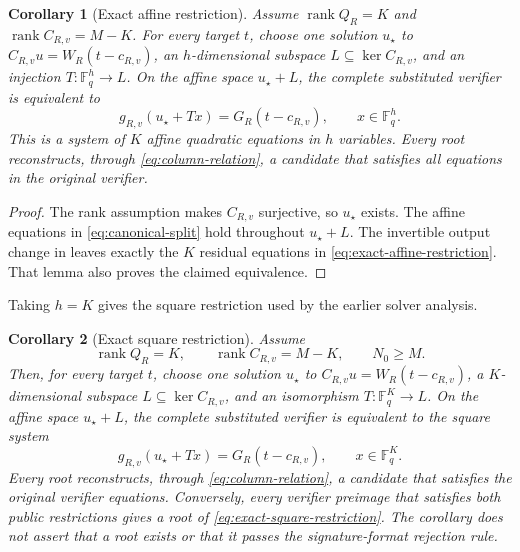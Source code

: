 \documentclass[11pt]{article}
\newtheorem{corollary}[corollary]{Corollary}
\newcommand{\F}{\mathbb F}
\newcommand{\rank}{\operatorname{rank}}
\begin{document}
\begin{corollary}[Exact affine restriction]
\label{cor:exact-affine-restriction}
Assume $\rank Q_R=K$ and $\rank C_{R,v}=M-K$.  For every target $t$, choose
one solution $u_\star$ to $C_{R,v}u=W_R(t-c_{R,v})$, an $h$-dimensional
subspace $L\subseteq\ker C_{R,v}$, and an injection
$T:\F_q^h\to L$.  On the affine space $u_\star+L$, the complete substituted
verifier is equivalent to
\begin{equation}
  g_{R,v}(u_\star+Tx)=G_R(t-c_{R,v}),
  \qquad x\in\F_q^h.                               \label{eq:exact-affine-restriction}
\end{equation}
This is a system of $K$ affine quadratic equations in $h$ variables.  Every
root reconstructs, through \eqref{eq:column-relation}, a candidate that
satisfies all equations in the original verifier.
\end{corollary}

\begin{proof}
The rank assumption makes $C_{R,v}$ surjective, so $u_\star$ exists.  The
affine equations in \eqref{eq:canonical-split} hold throughout
$u_\star+L$.  The invertible output change in
 leaves exactly the $K$ residual equations in
\eqref{eq:exact-affine-restriction}.  That lemma also proves the claimed
equivalence.
\end{proof}

Taking $h=K$ gives the square restriction used by the earlier solver
analysis.

\begin{corollary}[Exact square restriction]
\label{cor:exact-square-restriction}
Assume
\[
  \rank Q_R=K,
  \qquad
  \rank C_{R,v}=M-K,
  \qquad
  N_0\ge M.
\]
Then, for every target $t$, choose one solution $u_\star$ to
$C_{R,v}u=W_R(t-c_{R,v})$, a $K$-dimensional subspace
$L\subseteq\ker C_{R,v}$, and an isomorphism
$T:\F_q^K\to L$.  On the affine space $u_\star+L$, the complete substituted
verifier is equivalent to the square system
\begin{equation}
  g_{R,v}(u_\star+Tx)=G_R(t-c_{R,v}),
  \qquad x\in\F_q^K.                               \label{eq:exact-square-restriction}
\end{equation}
Every root reconstructs, through \eqref{eq:column-relation}, a candidate that
satisfies the original verifier equations.  Conversely, every verifier
preimage that satisfies both public restrictions gives a root of
\eqref{eq:exact-square-restriction}.  The corollary does not assert that a root
exists or that it passes the signature-format rejection rule.
\end{corollary}
\end{document}
